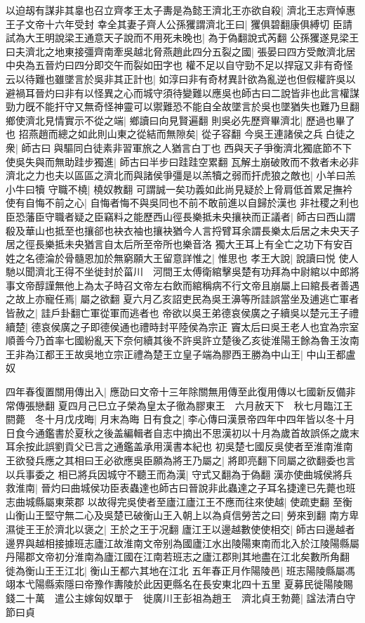 以迫刼有謀非其辠也召立齊孝王太子夀是為懿王濟北王亦欲自殺|{
	濟北王志齊悼惠王子文帝十六年受封}
幸全其妻子齊人公孫玃謂濟北王曰|{
	玃俱碧翻康俱縛切}
臣請試為大王明說梁王通意天子說而不用死未晚也|{
	為于偽翻說式芮翻}
公孫玃遂見梁王曰夫濟北之地東接彊齊南牽吳越北脅燕趙此四分五裂之國|{
	張晏曰四方受敵濟北居中央為五晉灼曰四分即交午而裂如田字也}
權不足以自守勁不足以捍寇又非有奇怪云以待難也雖墜言於吳非其正計也|{
	如淳曰非有奇材異計欲為亂逆也但假權許吳以避禍耳晉灼曰非有以怪異之心而城守須待變難以應吳也師古曰二說皆非也此言權謀勁力旣不能扞守又無奇怪神靈可以禦難恐不能自全故墜言於吳也墜猶失也難乃旦翻}
鄉使濟北見情實示不從之端|{
	鄉讀曰向見賢遍翻}
則吳必先歷齊畢濟北|{
	歷過也畢了也}
招燕趙而總之如此則山東之從結而無隙矣|{
	從子容翻}
今吳王連諸侯之兵白徒之衆|{
	師古曰與驅同白徒素非習軍旅之人猶言白丁也}
西與天子爭衡濟北獨底節不下使吳失與而無助跬步獨進|{
	師古曰半步曰跬跬空累翻}
瓦解土崩破敗而不救者未必非濟北之力也夫以區區之濟北而與諸侯爭彊是以羔犢之弱而扞虎狼之敵也|{
	小羊曰羔小牛曰犢}
守職不橈|{
	橈奴教翻}
可謂誠一矣功義如此尚見疑於上脅肩低首累足撫衿使有自悔不前之心|{
	自悔者悔不與吳同也不前不敢前進以自歸於漢也}
非社稷之利也臣恐藩臣守職者疑之臣竊料之能歷西山徑長樂抵未央攘袂而正議者|{
	師古曰西山謂殽及華山也抵至也攘郤也袂衣袖也攘袂猶今人言捋臂耳余謂長樂太后居之未央天子居之徑長樂抵未央猶言自太后所至帝所也樂音洛}
獨大王耳上有全亡之功下有安百姓之名德淪於骨髓恩加於無窮願大王留意詳惟之|{
	惟思也}
孝王大說|{
	說讀曰悦}
使人馳以聞濟北王得不坐徙封於菑川　河間王太傅衛綰擊吳楚有功拜為中尉綰以中郎將事文帝醇謹無他上為太子時召文帝左右飲而綰稱病不行文帝且崩屬上曰綰長者善遇之故上亦寵任焉|{
	屬之欲翻}
夏六月乙亥詔吏民為吳王濞等所詿誤當坐及逋逃亡軍者皆赦之|{
	詿戶卦翻亡軍從軍而逃者也}
帝欲以吳王弟德哀侯廣之子續吳以楚元王子禮續楚|{
	德哀侯廣之子即德侯通也禮時封平陸侯為宗正}
竇太后曰吳王老人也宜為宗室順善今乃首率七國紛亂天下奈何續其後不許吳許立楚後乙亥徙淮陽王餘為魯王汝南王非為江都王王故吳地立宗正禮為楚王立皇子端為膠西王勝為中山王|{
	中山王都盧奴}


四年春復置關用傳出入|{
	應劭曰文帝十三年除關無用傳至此復用傳以七國新反備非常傳張戀翻}
夏四月己巳立子榮為皇太子徹為膠東王　六月赦天下　秋七月臨江王閼薨　冬十月戊戌晦|{
	月末為晦}
日有食之|{
	李心傳曰漢景帝四年中四年皆以冬十月日食今通鑑書於夏秋之後盖編輯者自志中摘出不思漢初以十月為歲首故誤係之歲末耳余按此誤劉貢父已言之通鑑盖承用漢書本紀也}
初吳楚七國反吳使者至淮南淮南王欲發兵應之其相曰王必欲應吳臣願為將王乃屬之|{
	將即亮翻下同屬之欲翻委也言以兵事委之}
相已將兵因城守不聽王而為漢|{
	守式又翻為于偽翻}
漢亦使曲城侯將兵救淮南|{
	晉灼曰曲城侯功臣表蟲達也師古曰晉說非此蟲達之子耳名捷達已先薨也班志曲城縣屬東萊郡}
以故得完吳使者至廬江廬江王不應而往來使越|{
	使疏吏翻}
至衡山衡山王堅守無二心及吳楚已破衡山王入朝上以為貞信勞苦之曰|{
	勞來到翻}
南方卑濕徙王王於濟北以褒之|{
	王於之王于况翻}
廬江王以邊越數使使相交|{
	師古曰邊越者邊界與越相接據班志廬江故淮南文帝别為國廬江水出陵陽東南而北入於江陵陽縣屬丹陽郡文帝初分淮南為廬江國在江南若班志之廬江郡則其地盡在江北矣數所角翻}
徙為衡山王王江北|{
	衡山王都六其地在江北}
五年春正月作陽陵邑|{
	班志陽陵縣屬馮翊本弋陽縣索隱曰帝豫作夀陵於此因更縣名在長安東北四十五里}
夏募民徙陽陵賜錢二十萬　遣公主嫁匈奴單于　徙廣川王彭祖為趙王　濟北貞王勃薨|{
	諡法清白守節曰貞}


